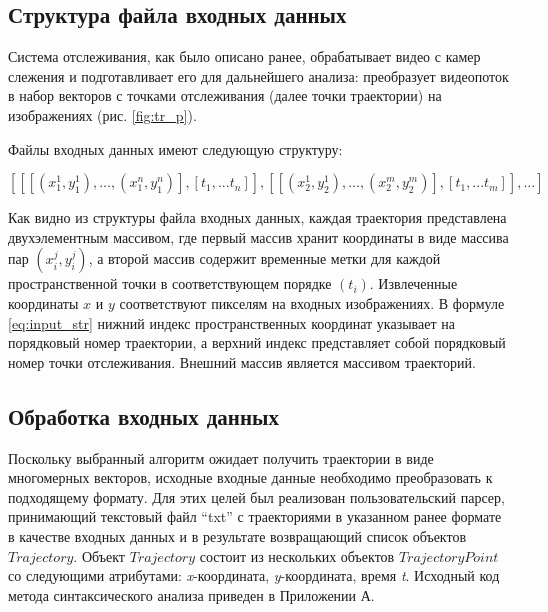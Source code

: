 \subsection{Структура файла входных данных}

Система отслеживания, как было описано ранее, обрабатывает видео с камер слежения и подготавливает его для дальнейшего анализа: преобразует видеопоток в набор векторов с точками отслеживания (далее точки траектории) на изображениях (рис. \ref{fig:tr_p}).

Файлы входных данных имеют следующую структуру:

\begin{equation} \label{eq:input_str}
[[[(x_1^1, y_1^1), ..., (x_1^n, y_1^n)], [t_1, ... t_n]], [[(x_2^1, y_2^1), ..., (x_2^m, y_2^m)], [t_1, ... t_m]], ...]
\end{equation}

Как видно из структуры файла входных данных, каждая траектория представлена двухэлементным массивом, где первый массив хранит координаты в виде массива пар $(x_i^j, y_i^j)$, а второй массив содержит временные метки для каждой пространственной точки в соответствующем порядке $(t_i)$. Извлеченные координаты $x$ и $y$ соответствуют пикселям на входных изображениях. В формуле \ref{eq:input_str} нижний индекс пространственных координат указывает на порядковый номер траектории, а верхний индекс представляет собой порядковый номер точки отслеживания. Внешний массив является массивом траекторий.

\subsection{Обработка входных данных}

Поскольку выбранный алгоритм ожидает получить траектории в виде многомерных векторов, исходные входные данные необходимо преобразовать к подходящему формату. Для этих целей был реализован пользовательский парсер, принимающий текстовый файл ``txt'' с траекториями в указанном ранее формате в качестве входных данных и в результате возвращающий список объектов $Trajectory$. Объект $Trajectory$ состоит из нескольких объектов $TrajectoryPoint$ со следующими атрибутами: \textit{x}-координата, \textit{y}-координата, время \textit{t}. Исходный код метода синтаксического анализа приведен в Приложении А.

